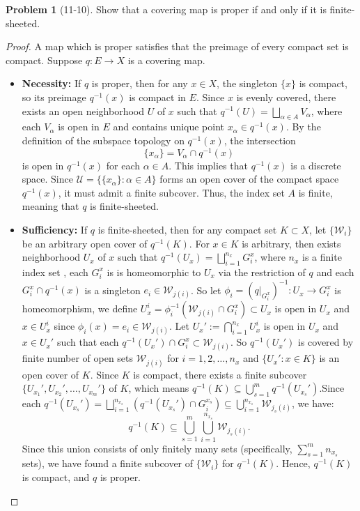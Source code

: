 \documentclass[11pt, a4paper]{article}
\theoremstyle{definition}
\newtheorem{prob}{Problem}
\newenvironment{problem}[1][]{\begin{prob}[#1]\normalfont}{\end{prob}\vspace{1.5em}}
\begin{document}
\begin{problem}[11-10]
Show that a covering map is proper if and only if it is finite-sheeted.
\begin{proof}
A map which is proper satisfies that the preimage of every compact set is compact. Suppose $q: E \to X$ is a covering
map.
\begin{itemize}
    \item[$1^\circ$] \textbf{Necessity:} If $q$ is proper, then for any $x \in X$, the singleton $\{x\}$ is compact, 
    so its preimage $q^{-1}(x)$ is compact in $E$. Since $x$ is evenly covered, there exists an open neighborhood 
    $U$ of $x$ such that $q^{-1}(U) = \bigsqcup_{\alpha \in A} V_\alpha$, where each $V_\alpha$ is open in $E$ and 
    contains unique point $x_\alpha \in q^{-1}(x)$. By the definition of the subspace topology on $q^{-1}(x)$, 
    the intersection
    $$\{x_\alpha\} = V_\alpha \cap q^{-1}(x)$$
    is open in $q^{-1}(x)$ for each $\alpha \in A$. This implies that $q^{-1}(x)$ is a discrete space. Since 
    $\mathcal{U} = \{\{x_\alpha\} : \alpha \in A\}$ forms an open cover of the compact space $q^{-1}(x)$, it must 
    admit a finite subcover. Thus, the index set $A$ is finite, meaning that $q$ is finite-sheeted.

    \item[$2^\circ$] \textbf{Sufficiency:} If $q$ is finite-sheeted, then for any compact set $K \subset X$, let 
    $\{\mathcal{W} _i\}$ be an arbitrary open cover of $q^{-1}(K)$. For $x\in K$ is arbitrary, then exists neighborhood $U_x$ of $x$ such that 
    $q^{-1}(U_x) = \bigsqcup_{i = 1}^{n_x} G_{i}^{x}$, where $n_x$ is a finite index set , each $G_{i}^{x}$ is 
    is homeomorphic to $U_x$ via the restriction of $q$ and each $G_{i}^{x}\cap q^{-1}(x)$ is a singleton 
    $e_i\in \mathcal{W} _{j(i)} $. So let $\phi _i = (q|_{G_{i}^{x}})^{-1}:U_x \to G_{i}^{x}$ is homeomorphism, we
    define $U_x^i = \phi _i^{-1}(\mathcal{W} _{j(i)}\cap G_{i}^{x})\subset U_x$ is open in $U_x$ and $x\in U_x^i$ 
    since $\phi _i(x)=e_i\in \mathcal{W} _{j(i)}$. Let $U_x' := \bigcap_{i=1}^{n_x} U_x^i$ is open in $U_x$ and 
    $x\in U_x'$ such that each $q^{-1}(U_x')\cap G_{i}^{x}\subset \mathcal{W} _{j(i)}$. So $q^{-1}(U_x')$ is covered 
    by finite number of open sets $\mathcal{W} _{j(i)}$ for $i=1,2,\ldots,n_x$ and $\{U_x':x\in K\}$ is an open 
    cover of $K$. Since $K$ is compact, there exists a finite subcover $\{U_{x_1}', U_{x_2}', \ldots, U_{x_m}'\}$ 
    of $K$, which means $q^{-1}(K) \subseteq \bigcup_{s=1}^m q^{-1}(U_{x_s}')$.Since each 
    $q^{-1}(U_{x_s}') = \bigsqcup_{i=1}^{n_{x_s}} (q^{-1}(U_{x_s}') \cap G^{x_s}_i) \subseteq \bigcup_{i=1}^{n_{x_s}} \mathcal{W}_{j_s(i)}$, 
    we have:
    $$q^{-1}(K) \subseteq \bigcup_{s=1}^m \bigcup_{i=1}^{n_{x_s}} \mathcal{W}_{j_s(i)}.$$
    Since this union consists of only finitely many sets (specifically, $\sum_{s=1}^m n_{x_s}$ sets), we have 
    found a finite subcover of $\{\mathcal{W}_i\}$ for $q^{-1}(K)$. Hence, $q^{-1}(K)$ is compact, and $q$ is 
    proper.
    

\end{itemize}
\end{proof}
\end{problem}
\end{document}
